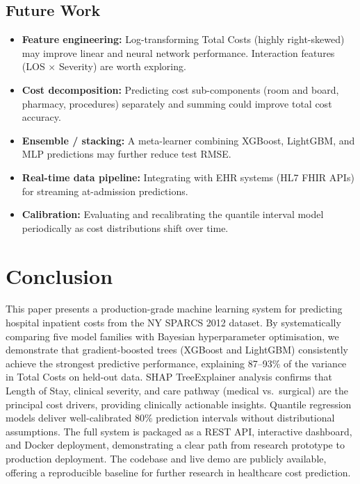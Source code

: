\documentclass[11pt,a4paper]{article}
\begin{document}
\subsection{Future Work}
\begin{itemize}
  \item \textbf{Feature engineering:} Log-transforming Total Costs (highly right-skewed) may improve linear and neural network performance. Interaction features (LOS $\times$ Severity) are worth exploring.
  \item \textbf{Cost decomposition:} Predicting cost sub-components (room and board, pharmacy, procedures) separately and summing could improve total cost accuracy.
  \item \textbf{Ensemble / stacking:} A meta-learner combining XGBoost, LightGBM, and MLP predictions may further reduce test RMSE.
  \item \textbf{Real-time data pipeline:} Integrating with EHR systems (HL7 FHIR APIs) for streaming at-admission predictions.
  \item \textbf{Calibration:} Evaluating and recalibrating the quantile interval model periodically as cost distributions shift over time.
\end{itemize}

\section{Conclusion}
This paper presents a production-grade machine learning system for predicting hospital inpatient costs from the NY SPARCS 2012 dataset. By systematically comparing five model families with Bayesian hyperparameter optimisation, we demonstrate that gradient-boosted trees (XGBoost and LightGBM) consistently achieve the strongest predictive performance, explaining 87--93\% of the variance in Total Costs on held-out data. SHAP TreeExplainer analysis confirms that Length of Stay, clinical severity, and care pathway (medical vs.\ surgical) are the principal cost drivers, providing clinically actionable insights. Quantile regression models deliver well-calibrated 80\% prediction intervals without distributional assumptions. The full system is packaged as a REST API, interactive dashboard, and Docker deployment, demonstrating a clear path from research prototype to production deployment. The codebase and live demo are publicly available, offering a reproducible baseline for further research in healthcare cost prediction.
\end{document}
